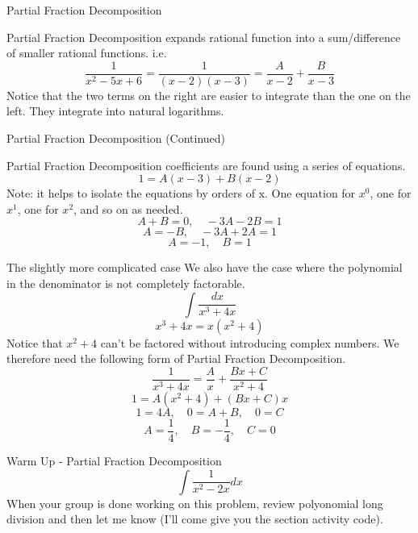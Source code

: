 \documentclass{beamer}
\begin{document}
\begin{frame}{Partial Fraction Decomposition}

Partial Fraction Decomposition expands rational function into a sum/difference of smaller rational functions. i.e. 
\[
    \frac{1}{x^2 - 5x + 6} = \frac{1}{(x-2)(x-3)} = \frac{A}{x-2} + \frac{B}{x-3}
\]
Notice that the two terms on the right are easier to integrate than the one on the left. They integrate into natural logarithms.

\end{frame}
\begin{frame}{Partial Fraction Decomposition (Continued)}

Partial Fraction Decomposition coefficients are found using a series of equations. 
\[
    1 = A(x - 3) + B(x - 2)
\]
Note: it helps to isolate the equations by orders of x. One equation for $x^0$, one for $x^1$, one for $x^2$, and so on as needed. 
\[
    A + B = 0, \quad -3A - 2B = 1
\]
\[
    A = -B, \quad -3A + 2A = 1
\]
\[
    A = -1, \quad B = 1
\]
\end{frame}
\begin{frame}{The slightly more complicated case}
    We also have the case where the polynomial in the denominator is not completely factorable. 
    \[
        \int \frac{dx}{x^3 + 4x}
    \]
    \[
        x^3 + 4x = x(x^2 + 4)
    \]
    Notice that $x^2 + 4$ can't be factored without introducing complex numbers. We therefore need the following form of Partial Fraction Decomposition. 
    \[
        \frac{1}{x^3 + 4x} = \frac{A}{x} + \frac{Bx + C}{x^2 + 4}
    \]
    \[
        1 = A(x^2 + 4) + (Bx + C)x
    \]
    \[
        1 = 4A, \quad 0 = A + B, \quad 0 = C
    \]
    \[
        A = \frac{1}{4}, \quad B = -\frac{1}{4}, \quad C = 0
    \]
\end{frame}

\begin{frame}{Warm Up - Partial Fraction Decomposition}
    \Large
    \[
        \int \frac{1}{x^2 - 2x}dx
    \] 
    \normalsize
    When your group is done working on this problem, review polyonomial long division and then let me know (I'll come give you the section activity code). 

\end{frame}
\end{document}
